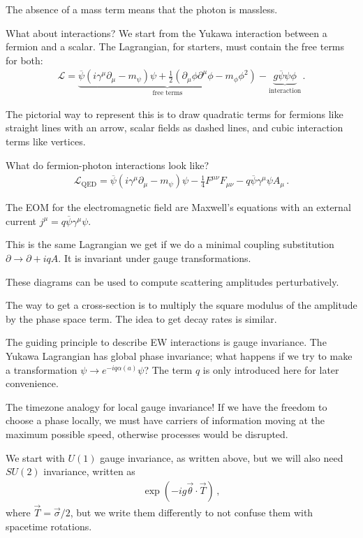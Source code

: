\documentclass[main.tex]{subfiles}
\begin{document}
The absence of a mass term means that the photon is massless. 

What about interactions? 
We start from the Yukawa interaction between a fermion and a scalar. 
The Lagrangian, for starters, must contain the free terms for both: 
%
\begin{align}
\mathscr{L} = \underbrace{\overline{\psi} \left(i \gamma^{\mu } \partial_{\mu } - m_\psi \right) \psi + \frac{1}{2} \left( \partial_{\mu } \phi \partial^{\mu } \phi -  m_\phi  \phi^2 \right) }_{\text{free terms}} - \underbrace{g \overline{\psi} \psi \phi}_{\text{interaction}} 
\,.
\end{align}

The pictorial way to represent this is to draw quadratic terms for fermions like straight lines with an arrow, scalar fields as dashed lines, and cubic interaction terms like vertices. 

What do fermion-photon interactions look like?  
%
\begin{align}
\mathscr{L} _{\text{QED}} = \overline{\psi} \left(i \gamma^{\mu } \partial_{\mu } - m_\psi \right) \psi - \frac{1}{4} F^{\mu \nu } F_{\mu \nu } - q \overline{\psi} \gamma^{\mu } \psi A_\mu 
\,.
\end{align}

The EOM for the electromagnetic field are  Maxwell's equations with an external current \(j^{\mu } = q \overline{\psi} \gamma^{\mu } \psi \). 

This is the same Lagrangian we get if we do a minimal coupling substitution \(\partial \to \partial + iqA\). 
It is invariant under gauge transformations. 

These diagrams can be used to compute scattering amplitudes perturbatively. 

The way to get a cross-section is to multiply the square modulus of the amplitude by the phase space term. 
The idea to get decay rates is similar. 

The guiding principle to describe EW interactions is gauge invariance. 
The Yukawa Lagrangian has global phase invariance; what happens if we try to make a transformation \(\psi \to e^{- i q \alpha (a)} \psi \)?
The term \(q\) is only introduced here for later convenience.

The timezone analogy for local gauge invariance! 
If we have the freedom to choose a phase locally, we must have carriers of information moving at the maximum possible speed, otherwise processes would be disrupted.

We start with \(U(1)\) gauge invariance, as written above, but we will also need \(SU(2)\) invariance, written as 
%
\begin{align}
\exp(- ig \vec{\theta} \cdot \vec{T})
\,,
\end{align}
%
where \(\vec{T} = \vec{\sigma} / 2\), but we write them differently to not confuse them with spacetime rotations. 
\end{document}
